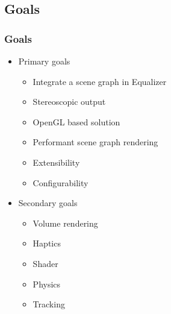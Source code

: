 \subsection{Goals}
\begin{frame}\frametitle{Goals}
	\begin{itemize}
		\item<1-> Primary goals
		\begin{itemize}
			\item Integrate a scene graph in Equalizer
			\item Stereoscopic output
			\item OpenGL based solution
			\item Performant scene graph rendering
			\item Extensibility
			\item Configurability
		\end{itemize}
		\item<2-> Secondary goals
		\begin{itemize}
			\item Volume rendering
			\item Haptics
			\item Shader
			\item Physics
			\item Tracking
		\end{itemize}
	\end{itemize}
\end{frame}


